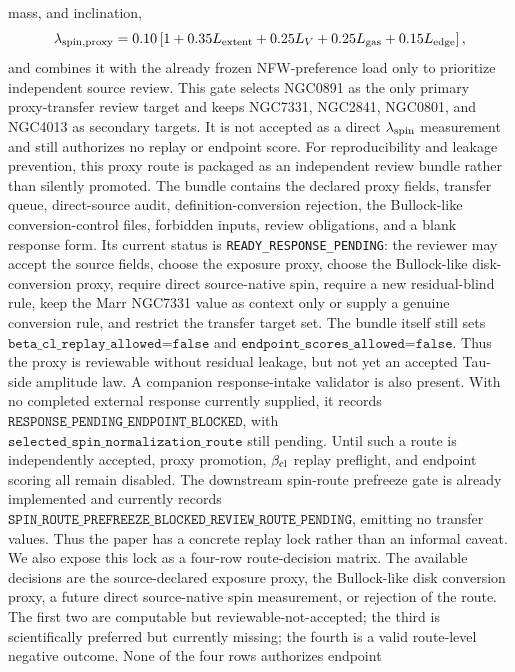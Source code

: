 \documentclass[11pt]{article}
\begin{document}
mass, and inclination,
\[
  \lambda_{\rm spin,proxy}
  =
  0.10\left[
    1 + 0.35 L_{\rm extent}
      + 0.25 L_V
      + 0.25 L_{\rm gas}
      + 0.15 L_{\rm edge}
  \right],
\]
and combines it with the already frozen NFW-preference load only to prioritize
independent source review.  This gate selects NGC0891 as the only primary
proxy-transfer review target and keeps NGC7331, NGC2841, NGC0801, and NGC4013
as secondary targets.  It is not accepted as a direct
\(\lambda_{\rm spin}\) measurement and still authorizes no replay or endpoint
score.
For reproducibility and leakage prevention, this proxy route is packaged as an
independent review bundle rather than silently promoted.  The bundle contains
the declared proxy fields, transfer queue, direct-source audit,
definition-conversion rejection, the Bullock-like conversion-control files,
forbidden inputs, review obligations, and a blank response form.  Its current
status is
\texttt{READY\_RESPONSE\_PENDING}: the reviewer may accept the source fields,
choose the exposure proxy, choose the Bullock-like disk-conversion proxy,
require direct source-native spin, require a new residual-blind rule, keep the
Marr NGC7331 value as context only or supply a genuine conversion rule, and
restrict the transfer target set.  The
bundle itself still sets \(\texttt{beta\_cl\_replay\_allowed=false}\) and
\(\texttt{endpoint\_scores\_allowed=false}\).  Thus the proxy is reviewable
without residual leakage, but not yet an accepted Tau-side amplitude law.
A companion response-intake validator is also present.  With no completed
external response currently supplied, it records
\(\texttt{RESPONSE\_PENDING\_ENDPOINT\_BLOCKED}\), with
\(\texttt{selected\_spin\_normalization\_route}\) still pending.  Until such a
route is independently accepted, proxy promotion, \(\beta_{\rm cl}\) replay
preflight, and endpoint scoring all remain disabled.
The downstream spin-route prefreeze gate is already implemented and currently
records
\(\texttt{SPIN\_ROUTE\_PREFREEZE\_BLOCKED\_REVIEW\_ROUTE\_PENDING}\), emitting
no transfer values.  Thus the paper has a concrete replay lock rather than an
informal caveat.
We also expose this lock as a four-row route-decision matrix.  The available
decisions are the source-declared exposure proxy, the Bullock-like disk
conversion proxy, a future direct source-native spin measurement, or rejection
of the route.  The first two are computable but reviewable-not-accepted; the
third is scientifically preferred but currently missing; the fourth is a valid
route-level negative outcome.  None of the four rows authorizes endpoint
\end{document}
